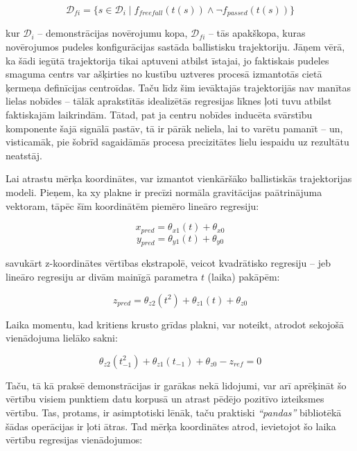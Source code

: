 \documentclass[12pt, a4paper]{article}
\numberwithin{equation}{section} %
\begin{document}
\begin{equation}
    \mathcal{D}_{fi} = \lbrace s \in \mathcal{D}_i \mid f_{freefall}(t(s)) \land \lnot f_{passed}(t(s)) \rbrace
\end{equation}

kur $\mathcal{D}_i$ -- demonstrācijas novērojumu kopa, $\mathcal{D}_{fi}$ -- tās apakškopa, kuras novērojumos pudeles konfigurācijas sastāda ballistisku trajektoriju. Jāņem vērā, ka šādi iegūtā trajektorija tikai aptuveni atbilst īstajai, jo faktiskais pudeles smaguma centrs var ašķirties no kustību uztveres procesā izmantotās cietā ķermeņa definīcijas centroīdas. Taču līdz šim ievāktajās trajektorijās nav manītas lielas nobīdes -- tālāk aprakstītās idealizētās regresijas līknes ļoti tuvu atbilst faktiskajām laikrindām. Tātad, pat ja centru nobīdes inducēta svārstību komponente šajā signālā pastāv, tā ir pārāk neliela, lai to varētu pamanīt -- un, visticamāk, pie šobrīd sagaidāmās procesa precizitātes lielu iespaidu uz rezultātu neatstāj.

Lai atrastu mērķa koordinātes, var izmantot vienkāršāko ballistiskās trajektorijas modeli. Pieņem, ka xy plakne ir precīzi normāla gravitācijas paātrinājuma vektoram, tāpēc šīm koordinātēm piemēro lineāro regresiju:


\begin{equation}
    x_{pred} = \theta_{x1}(t) + \theta_{x0}
\end{equation}
\begin{equation}
    y_{pred} = \theta_{y1}(t) + \theta_{y0}
\end{equation}

savukārt z-koordinātes vērtības ekstrapolē, veicot kvadrātisko regresiju -- jeb lineāro regresiju ar divām mainīgā parametra $t$ (laika) pakāpēm:

\begin{equation}
    z_{pred} = \theta_{z2}(t^2) + \theta_{z1}(t) + \theta_{z0}
\end{equation}

Laika momentu, kad kritiens krusto grīdas plakni, var noteikt,  atrodot sekojošā vienādojuma lielāko sakni:

\begin{equation}
    \theta_{z2}(t_{-1}^2) + \theta_{z1}(t_{-1}) + \theta_{z0} - z_{ref} = 0
\end{equation}

Taču, tā kā praksē demonstrācijas ir garākas nekā lidojumi, var arī aprēķināt šo vērtību visiem punktiem datu korpusā un atrast pēdējo pozitīvo izteiksmes vērtību. Tas, protams, ir asimptotiski lēnāk, taču praktiski \textit{``pandas''} bibliotēkā šādas operācijas ir ļoti ātras. Tad mērķa koordinātes atrod, ievietojot šo laika vērtību regresijas vienādojumos:
\end{document}
